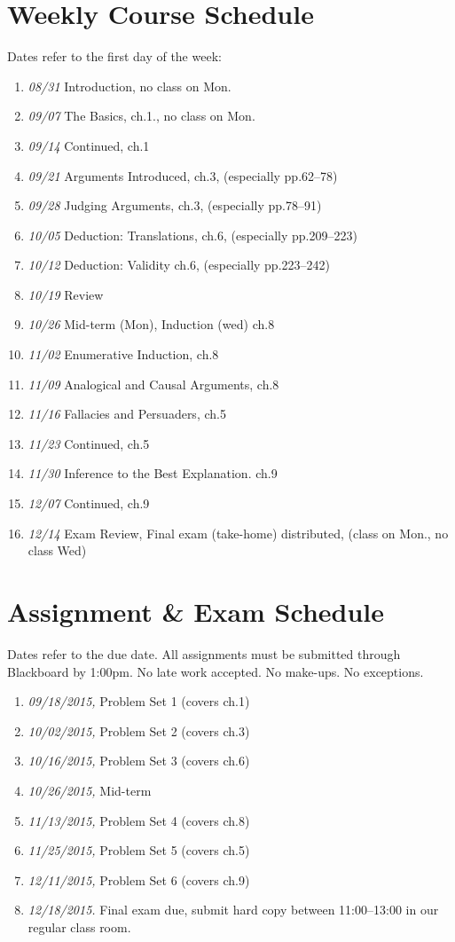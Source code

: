 \documentclass[11pt,article,oneside]{memoir}
\begin{document}
\section{Weekly Course Schedule}
Dates refer to the first day of the week: 
\begin{enumerate}
\item \textit{08/31} Introduction,  no class on Mon.
\item \textit{09/07} The Basics,  ch.1., no class on Mon.
\item \textit{09/14} Continued, ch.1 
\item \textit{09/21} Arguments Introduced, ch.3, (especially pp.62--78)
\item \textit{09/28} Judging Arguments, ch.3, (especially pp.78--91)
\item \textit{10/05} Deduction: Translations, ch.6, (especially pp.209--223)
\item \textit{10/12} Deduction: Validity ch.6, (especially pp.223--242)
\item \textit{10/19} Review
\item \textit{10/26} Mid-term (Mon), Induction (wed) ch.8
\item \textit{11/02} Enumerative Induction, ch.8
\item \textit{11/09} Analogical and Causal Arguments, ch.8
\item \textit{11/16} Fallacies and Persuaders, ch.5
 \item \textit{11/23} Continued, ch.5
 \item \textit{11/30} Inference to the Best Explanation. ch.9
\item \textit{12/07} Continued,  ch.9
\item \textit{12/14} Exam Review, Final exam (take-home) distributed, (class on Mon., no class Wed)
\end{enumerate}


\section{Assignment \& Exam Schedule}
Dates refer to the due date. All assignments must be submitted through Blackboard by 1:00pm. No late work accepted. No make-ups. No exceptions. 

\begin{enumerate}
\item \textit{09/18/2015,} Problem Set 1 (covers ch.1)
\item \textit{10/02/2015,} Problem Set 2 (covers ch.3)
\item \textit{10/16/2015,} Problem Set 3 (covers ch.6)
\item \textit{10/26/2015,} Mid-term 
\item \textit{11/13/2015,} Problem Set 4 (covers ch.8)
\item \textit{11/25/2015,} Problem Set 5 (covers ch.5)
\item \textit{12/11/2015,} Problem Set 6 (covers ch.9)
\item \textit{12/18/2015.} Final exam due, submit hard copy between 11:00--13:00 in our regular class room. 
\end{enumerate}


\end{document}
